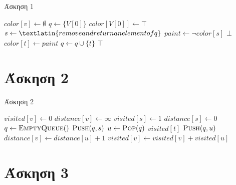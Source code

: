 \documentclass[11pt,a4paper]{book}
\begin{document}
\begin{algorithm}[H]
\caption{\textgreek{Άσκηση 1}}
\begin{algorithmic}[1]

        \State $color[ v ] \gets \emptyset$
    \EndFor
    \State $q \gets \{ V[ 0 ] \}$
    \State $color[ V[ 0 ] ] \gets \top$
        \State $s \gets \textlatin{remove and return an element of q}$
        \State $paint \gets \lnot color[ s ]$
                    \State \Return $\bot$
                \EndIf
            \Else
                \State $color[ t ] \gets paint$
                \State $q \gets q \cup \{ t \}$
            \EndIf
        \EndFor
    \EndWhile
    \State \Return $\top$
\EndProcedure
\end{algorithmic}
\end{algorithm}

\section*{Άσκηση 2}
\begin{algorithm}[H]
\caption{\textgreek{Άσκηση 2}}
\begin{algorithmic}[1]

        \State $visited[ v ] \gets 0$
        \State $distance[ v ] \gets \infty$
    \EndFor
    \State $visited[ s ] \gets 1$
    \State $distance[ s ] \gets 0$
    \State $q \gets \Call{EmptyQueue}$
    \State $\Call{Push}{q, s}$
        \State $u \gets \Call{Pop}{q}$
            \State \Return $visited[ t ]$
        \EndIf
                \State $\Call{Push}{q, u}$
            \EndIf
                \State $distance[ v ] \gets distance[ u ] + 1$
                \State $visited[ v ] \gets visited[ v ] + visited[ u ]$
            \EndIf
        \EndFor
    \EndWhile
\EndProcedure
\end{algorithmic}
\end{algorithm}

\section*{Άσκηση 3}
\end{document}

